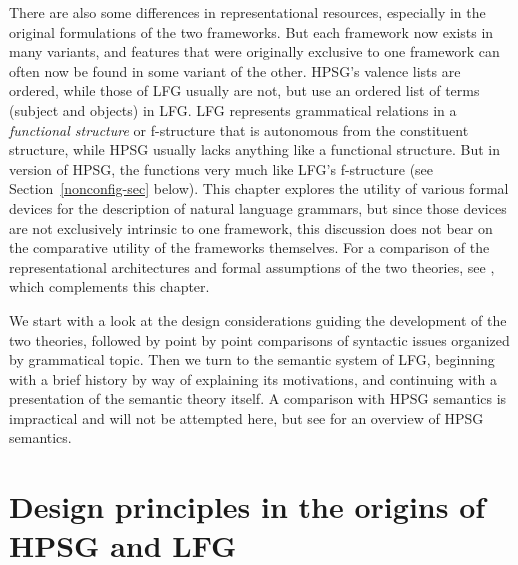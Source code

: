 There are also some differences in representational resources, especially in the original formulations of the two frameworks.
But each framework now exists in many variants, and features that were originally exclusive to one framework can often now be found in some variant of the other.   HPSG's valence lists are ordered, while those of LFG usually are not, but \citet{andrews1999complex} use an ordered list of terms (subject and objects) in LFG.  
LFG represents grammatical relations in a \textit{functional structure} or f-structure that is autonomous from the constituent structure, while HPSG usually lacks anything like a functional structure. 
But in  
version of HPSG, the \compsl functions very much like LFG's f-structure (see Section~\ref{nonconfig-sec} below).  This chapter explores the utility of various formal devices for the description of natural language grammars, but since those devices are not exclusively intrinsic to one framework, this discussion does not bear on the comparative utility of the frameworks themselves. For a comparison of the representational architectures and formal assumptions of the two theories, see \citet{Przepiorkowski2021a}, which complements this chapter. 


\largerpage 
We start with a look at the design considerations guiding the development of the two theories,
followed by point by point comparisons of syntactic issues organized by grammatical topic.  Then we
turn to the semantic system of LFG, beginning with a brief history by way of explaining its
motivations, and continuing with a presentation of the semantic theory itself.  A comparison with
HPSG semantics is impractical and will not be attempted here, but see 
for an overview of HPSG semantics.

\section{Design principles in the origins of HPSG and LFG} 
\label{design-sec}

